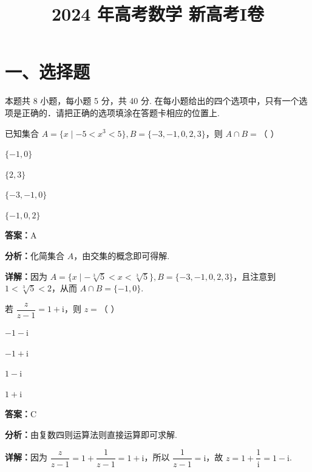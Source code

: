 ﻿\title{2024 年高考数学 新高考I卷}
\date{}
\maketitle

\section*{一、选择题}
本题共 8 小题，每小题 5 分，共 40 分. 在每小题给出的四个选项中，只有一个选项是正确的．请把正确的选项填涂在答题卡相应的位置上.

\begin{question}[points=5]
已知集合 $A=\{x\mid -5 < x^3 < 5\}, B=\{-3,-1,0,2,3\}$，则 $A\cap B=$（ ）
\begin{choices}
  \item $\{-1,0\}$
  \item $\{2,3\}$
  \item $\{-3,-1,0\}$
  \item $\{-1,0,2\}$
\end{choices}
\begin{solution}
\textbf{答案：}A

\textbf{分析：}化简集合 $A$，由交集的概念即可得解.

\textbf{详解：}因为 $A=\{x\mid -\sqrt[3]{5} < x < \sqrt[3]{5}\}, B=\{-3,-1,0,2,3\}$，且注意到 $1 < \sqrt[3]{5} < 2$，从而 $A\cap B=\{-1,0\}$.
\end{solution}
\end{question}

\begin{question}[points=5]
若 $\dfrac{z}{z-1}=1+\mathrm{i}$，则 $z=$（ ）
\begin{choices}
  \item $-1-\mathrm{i}$
  \item $-1+\mathrm{i}$
  \item $1-\mathrm{i}$
  \item $1+\mathrm{i}$
\end{choices}
\begin{solution}
\textbf{答案：}C

\textbf{分析：}由复数四则运算法则直接运算即可求解.

\textbf{详解：}因为 $\dfrac{z}{z-1}=1+\dfrac{1}{z-1}=1+\mathrm{i}$，所以 $\dfrac{1}{z-1}=\mathrm{i}$，故 $z=1+\dfrac{1}{\mathrm{i}}=1-\mathrm{i}$.
\end{solution}
\end{question}

